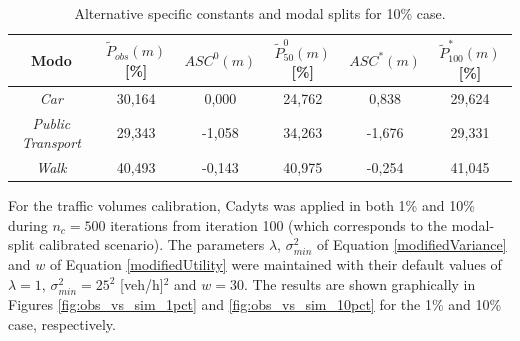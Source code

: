 \documentclass[Journal,letterpaper]{ascelike-new}
\begin{document}
\begin{table}
	\caption{Alternative specific constants and modal splits for 10\% case.}
	\begin{tabular}{c|c|cc|cc}
		\hline
		Modo                      &$\tilde{P}_{obs}(m)$ [\%]& $ASC^{0}(m)$	& $\tilde{P}_{50}^{0}(m)$ [\%]	& $ASC^{*}(m)$& $\tilde{P}_{100}^{*}(m)$ [\%]\\
		\hline
		\emph{Car}             	  & 30,164 & 0,000 & 24,762 & 0,838  & 29,624 \\
		\emph{Public Transport}   & 29,343 &-1,058 & 34,263 & -1,676 & 29,331 \\
		\emph{Walk}               & 40,493 &-0,143 & 40,975 & -0,254 & 41,045 \\
		\hline
	\end{tabular}
\label{table:modal_splits_10pct}
\end{table}
For the traffic volumes calibration, Cadyts was applied in both 1\% and 10\% during $n_{c}=500$ iterations from iteration 100 (which corresponds to the modal-split calibrated scenario). The parameters $\lambda$, $\sigma^{2}_{min}$ of Equation \ref{modifiedVariance} and $w$ of Equation \ref{modifiedUtility} were maintained with their default values of $\lambda=1$, $\sigma^{2}_{min}=25^2$ [veh/h]$^2$ and $w=30$. The results are shown graphically in Figures \ref{fig:obs_vs_sim_1pct} and \ref{fig:obs_vs_sim_10pct} for the 1\% and 10\% case, respectively.
\end{document}
